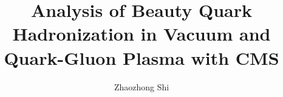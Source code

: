 % 
% 
%
%
%
%
%
%
%
%
% 
% 

\title{Analysis of Beauty Quark Hadronization in Vacuum and Quark-Gluon Plasma with CMS}

\author{Zhaozhong Shi}




